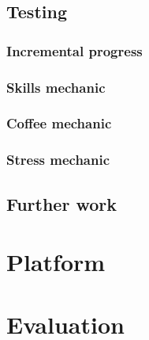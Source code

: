 \documentclass[11pt]{article}
\begin{document}
\subsection{Testing}

\subsubsection{Incremental progress}

\subsubsection{Skills mechanic}

\subsubsection{Coffee mechanic}

\subsubsection{Stress mechanic}


\subsection{Further work}

\section{Platform}

\section{Evaluation}
\end{document}
